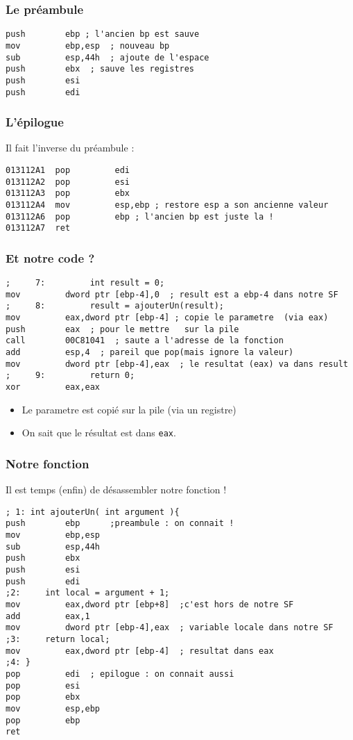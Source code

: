 \documentclass{beamer}
\begin{document}
\begin{frame}[fragile]
\frametitle{Le préambule} 
\begin{lstlisting}[language={[x86masm]Assembler}, basicstyle={\scriptsize\ttfamily}]
push        ebp ; l'ancien bp est sauve
mov         ebp,esp  ; nouveau bp
sub         esp,44h  ; ajoute de l'espace
push        ebx  ; sauve les registres
push        esi  
push        edi  
\end{lstlisting}
\end{frame}

\begin{frame}[fragile]
\frametitle{L'épilogue}
Il fait l'inverse du préambule :
\begin{lstlisting}[language={[x86masm]Assembler}, basicstyle={\scriptsize\ttfamily}]
013112A1  pop         edi
013112A2  pop         esi
013112A3  pop         ebx
013112A4  mov         esp,ebp ; restore esp a son ancienne valeur
013112A6  pop         ebp ; l'ancien bp est juste la !
013112A7  ret
\end{lstlisting}
\end{frame}

\begin{frame}[fragile]
\frametitle{Et notre code ?}
\begin{lstlisting}[language={[x86masm]Assembler}, basicstyle={\scriptsize\ttfamily}]
;     7:         int result = 0;
mov         dword ptr [ebp-4],0  ; result est a ebp-4 dans notre SF 
;     8:         result = ajouterUn(result);
mov         eax,dword ptr [ebp-4] ; copie le parametre  (via eax)
push        eax  ; pour le mettre 	sur la pile 
call        00C81041  ; saute a l'adresse de la fonction
add         esp,4  ; pareil que pop(mais ignore la valeur)
mov         dword ptr [ebp-4],eax  ; le resultat (eax) va dans result
;     9:         return 0;
xor         eax,eax  
\end{lstlisting}
\begin{itemize}
\item Le parametre est copié sur la pile (via un registre)
\item On sait que le résultat est dans \texttt{eax}.
\end{itemize}
\end{frame}

\begin{frame}[fragile]
\frametitle{Notre fonction}
Il est temps (enfin) de désassembler notre fonction !
\begin{lstlisting}[language={[x86masm]Assembler}, basicstyle={\scriptsize\ttfamily}]
; 1: int ajouterUn( int argument ){
push        ebp      ;preambule : on connait !
mov         ebp,esp  
sub         esp,44h  
push        ebx  
push        esi  
push        edi  
;2: 	int local = argument + 1;
mov         eax,dword ptr [ebp+8]  ;c'est hors de notre SF
add         eax,1  
mov         dword ptr [ebp-4],eax  ; variable locale dans notre SF
;3: 	return local;
mov         eax,dword ptr [ebp-4]  ; resultat dans eax
;4: }
pop         edi  ; epilogue : on connait aussi
pop         esi  
pop         ebx  
mov         esp,ebp  
pop         ebp  
ret  
\end{lstlisting}

\end{frame}
\end{document}
